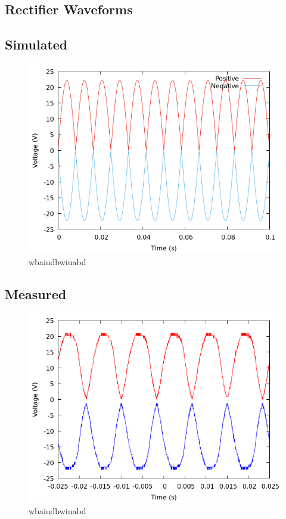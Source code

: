 \documentclass[12pt]{article}
\newcommand{\graphwidth}{0.5\linewidth}
\begin{document}
\begin{appendix}

\section{Rectifier Waveforms}

\subsection{Simulated}

\begin{figure}[H]
    \centering
    \includegraphics[width=\graphwidth]{./res/image/sim-rectifier-unfiltered.png}
    \caption{wbaiudbwiuabd}
    \label{sim:rectifier_unfiltered}
\end{figure}

\subsection{Measured}

\begin{figure}[H]
    \centering
    \includegraphics[width=\graphwidth]{./res/image/rectifier-output.png}
    \caption{wbaiudbwiuabd}
    \label{fig:rectifier_unfiltered}
\end{figure}


\end{appendix}
\end{document}
